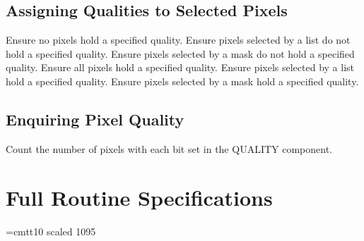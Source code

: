 \subsection{Assigning Qualities to Selected Pixels}
   {Ensure no pixels hold a specified quality.}
   {Ensure pixels selected by a list do not hold a specified quality.}
   {Ensure pixels selected by a mask do not hold a specified quality.}
   {Ensure all pixels hold a specified quality.}
   {Ensure pixels selected by a list hold a specified quality.}
   {Ensure pixels selected by a mask hold a specified quality.}

\subsection{Enquiring Pixel Quality}
   {Count the number of pixels with each bit set in the QUALITY component.}

\section {Full Routine Specifications}
\label {SEC:FULLSPEC}
\newlength{\sstbannerlength}
\newlength{\sstcaptionlength}
\font\ssttt=cmtt10 scaled 1095
\newcommand{\sstroutine}[3]{
   \goodbreak
   \rule{\textwidth}{0.5mm}
   \vspace{-7ex}
   \newline
   \settowidth{\sstbannerlength}{{\Large {\bf #1}}}
   \setlength{\sstcaptionlength}{\textwidth}
   \addtolength{\sstbannerlength}{0.5em}
   \addtolength{\sstcaptionlength}{-2.0\sstbannerlength}
   \addtolength{\sstcaptionlength}{-4.45pt}
   \parbox[t]{\sstbannerlength}{\flushleft{\Large {\bf #1}}}
   \parbox[t]{\sstcaptionlength}{\center{\Large #2}}
   \parbox[t]{\sstbannerlength}{\flushright{\Large {\bf #1}}}
   \begin{description}
      #3
   \end{description}
}

\newcommand{\sstdescription}[1]{\item[Description:] #1}

\newcommand{\sstusage}[1]{\item[Usage:] \mbox{} \\[1.3ex] {\ssttt #1}}

